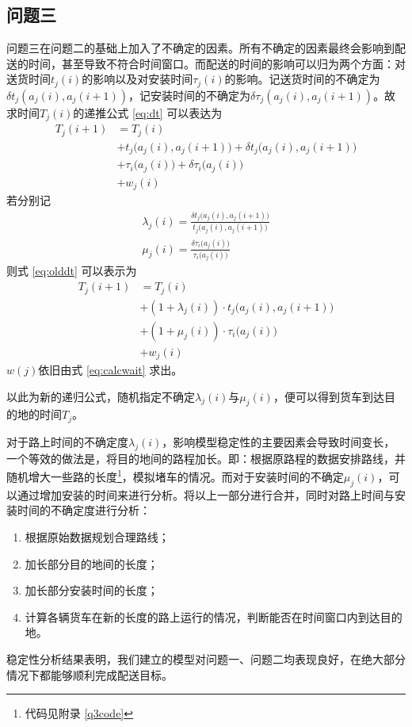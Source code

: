 \documentclass[UTF8,cs4size]{ctexart}
\begin{document}
\subsection{问题三}
问题三在问题二的基础上加入了不确定的因素。所有不确定的因素最终会影响到配送的时间，甚至导致不符合时间窗口。而配送的时间的影响可以归为两个方面：对送货时间$t_j(i)$的影响以及对安装时间$\tau _j(i)$的影响。记送货时间的不确定为$\delta t_{j}(a_j(i), a_j(i + 1))$，记安装时间的不确定为$\delta \tau _{j}(a_j(i), a_j(i + 1))$。故求时间$T_j(i)$的递推公式 \ref{eq:dt} 可以表达为
\begin{equation} \label{eq:olddt}
\begin{split}
  T_j(i+1)&=T_j(i) \\
  &+t_j\big(a_j(i),a_j(i+1)\big) +\delta t_j\big(a_j(i),a_j(i+1)\big) \\
  &+\tau _i\big(a_j(i)\big) +\delta \tau _i\big(a_j(i)\big) \\
  &+ w_j(i)
\end{split}
\end{equation}
若分别记
\begin{gather*}
  \lambda _j(i) = \frac{\delta t_j\big(a_j(i),a_j(i+1)\big)}{t_j\big(a_j(i),a_j(i+1)\big)} \\
  \mu _j(i) = \frac{\delta \tau _i\big(a_j(i)\big)}{\tau _i\big(a_j(i)\big)}
\end{gather*}
则式 \ref{eq:olddt} 可以表示为
\begin{equation}
\begin{split}
  T_j(i+1)&=T_j(i) \\
  &+(1+\lambda _j(i)) \cdot t_j\big(a_j(i),a_j(i+1)\big) \\
  &+(1+\mu _j(i)) \cdot \tau _i\big(a_j(i)\big) \\
  &+ w_j(i)
\end{split}
\end{equation}
$w(j)$依旧由式 \ref{eq:calcwait} 求出。

以此为新的递归公式，随机指定不确定$\lambda_j(i)$与$\mu_j(i)$，便可以得到货车到达目的地的时间$T_j$。

对于路上时间的不确定度$\lambda_j(i)$，影响模型稳定性的主要因素会导致时间变长，一个等效的做法是，将目的地间的路程加长。即：根据原路程的数据安排路线，并随机增大一些路的长度\footnote{代码见附录 \ref{q3code}}，模拟堵车的情况。而对于安装时间的不确定$\mu_j(i)$，可以通过增加安装的时间来进行分析。将以上一部分进行合并，同时对路上时间与安装时间的不确定度进行分析：
\begin{enumerate}
\item 根据原始数据规划合理路线；
\item 加长部分目的地间的长度；
\item 加长部分安装时间的长度；
\item 计算各辆货车在新的长度的路上运行的情况，判断能否在时间窗口内到达目的地。
\end{enumerate}
稳定性分析结果表明，我们建立的模型对问题一、问题二均表现良好，在绝大部分情况下都能够顺利完成配送目标。
\end{document}
